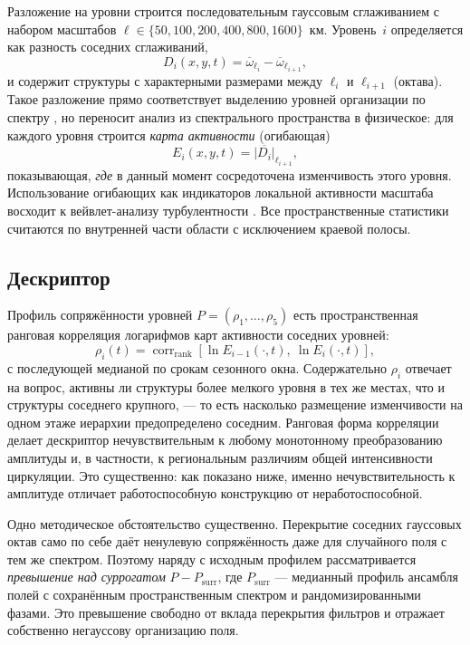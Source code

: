 \documentclass[11pt,a4paper]{article}
\begin{document}
Разложение на уровни строится последовательным гауссовым сглаживанием с набором масштабов $\ell\in\{50,100,200,400,800,1600\}$~км. Уровень~$i$ определяется как разность соседних сглаживаний,
\begin{equation}
D_i(x,y,t)=\overline{\omega}_{\ell_i}-\overline{\omega}_{\ell_{i+1}},
\end{equation}
и содержит структуры с характерными размерами между $\ell_i$ и $\ell_{i+1}$ (октава). Такое разложение прямо соответствует выделению уровней организации по спектру \cite{Krenke2019}, но переносит анализ из спектрального пространства в физическое: для каждого уровня строится \emph{карта активности} (огибающая)
\begin{equation}
E_i(x,y,t)=\overline{\lvert D_i\rvert}_{\ell_{i+1}},
\end{equation}
показывающая, \emph{где} в данный момент сосредоточена изменчивость этого уровня. Использование огибающих как индикаторов локальной активности масштаба восходит к вейвлет-анализу турбулентности \cite{Farge1992}. Все пространственные статистики считаются по внутренней части области с исключением краевой полосы.

\subsection{Дескриптор}

Профиль сопряжённости уровней $P=(\rho_1,\dots,\rho_5)$ есть пространственная ранговая корреляция логарифмов карт активности соседних уровней:
\begin{equation}
\rho_i(t)=\operatorname{corr}_{\mathrm{rank}}\!\left[\ln E_{i-1}(\cdot,t),\ \ln E_{i}(\cdot,t)\right],
\label{eq:rho}
\end{equation}
с последующей медианой по срокам сезонного окна. Содержательно $\rho_i$ отвечает на вопрос, активны ли структуры более мелкого уровня в тех же местах, что и структуры соседнего крупного, --- то есть насколько размещение изменчивости на одном этаже иерархии предопределено соседним. Ранговая форма корреляции делает дескриптор нечувствительным к любому монотонному преобразованию амплитуды и, в частности, к региональным различиям общей интенсивности циркуляции. Это существенно: как показано ниже, именно нечувствительность к амплитуде отличает работоспособную конструкцию от неработоспособной.

Одно методическое обстоятельство существенно. Перекрытие соседних гауссовых октав само по себе даёт ненулевую сопряжённость даже для случайного поля с тем же спектром. Поэтому наряду с исходным профилем рассматривается \emph{превышение над суррогатом} $P-P_{\mathrm{surr}}$, где $P_{\mathrm{surr}}$ --- медианный профиль ансамбля полей с сохранённым пространственным спектром и рандомизированными фазами. Это превышение свободно от вклада перекрытия фильтров и отражает собственно негауссову организацию поля.
\end{document}
